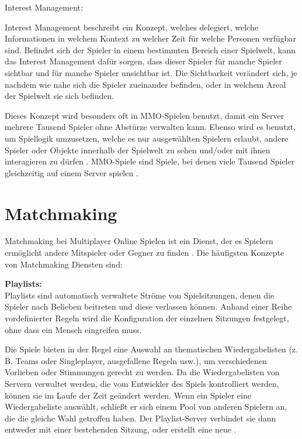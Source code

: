 \textsf{\Large Interest Management:}
\label{interest_management}

Interest Management beschreibt ein Konzept, welches delegiert, welche Informationen in welchem Kontext zu welcher Zeit für welche Personen verfügbar sind. Befindet sich der Spieler in einem bestimmten Bereich einer Spielwelt, kann das Interest Management dafür sorgen, dass dieser Spieler für manche Spieler sichtbar und für manche Spieler unsichtbar ist. Die Sichtbarkeit verändert sich, je nachdem wie nahe sich die Spieler zueinander befinden, oder in welchem Areal der Spielwelt sie sich befinden.

Dieses Konzept wird besonders oft in MMO-Spielen benutzt, damit ein Server mehrere Tausend Spieler ohne Abstürze verwalten kann. Ebenso wird es benutzt, um Spiellogik umzusetzen, welche es nur ausgewählten Spielern erlaubt, andere Spieler oder Objekte innerhalb der Spielwelt zu sehen und/oder mit ihnen interagieren zu dürfen \cite{Smed.2002c}. MMO-Spiele sind Spiele, bei denen viele Tausend Spieler gleichzeitig auf einem Server spielen \cite{Wikipedia.2021i}. 

\newpage

\section{Matchmaking}

Matchmaking bei Multiplayer Online Spielen ist ein Dienst, der es Spielern ermöglicht andere Mitspieler oder Gegner zu finden \cite{MaximeVeron.2014}.  Die häufigsten Konzepte von Matchmaking Diensten sind:

\textbf{Playlists:} \\
Playlists sind automatisch verwaltete Ströme von Spielsitzungen, denen die Spieler nach Belieben beitreten und diese verlassen können. Anhand einer Reihe vordefinierter Regeln wird die Konfiguration der einzelnen Sitzungen festgelegt, ohne dass ein Mensch eingreifen muss.  

Die Spiele bieten in der Regel eine Auswahl an thematischen Wiedergabelisten (z. B. Teams oder Singleplayer, ausgefallene Regeln usw.), um verschiedenen Vorlieben oder Stimmungen gerecht zu werden. Da die Wiedergabelisten von Servern verwaltet werden, die vom Entwickler des Spiels kontrolliert werden, können sie im Laufe der Zeit geändert werden. Wenn ein Spieler eine Wiedergabeliste auswählt, schließt er sich einem Pool von anderen Spielern an, die die gleiche Wahl getroffen haben. Der Playlist-Server verbindet sie dann entweder mit einer bestehenden Sitzung, oder erstellt eine neue \cite{Wikipedia.2021b}.

